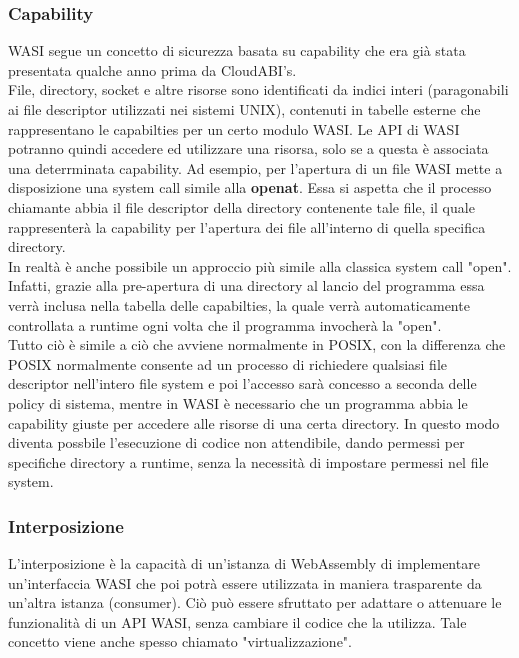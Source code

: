 \subsubsection{Capability}
WASI segue un concetto di sicurezza basata su capability che era già stata presentata qualche anno prima da CloudABI's.
\\File, directory, socket e altre risorse sono identificati da indici interi (paragonabili ai file descriptor utilizzati nei sistemi UNIX), contenuti in tabelle esterne che rappresentano le capabilties per un certo modulo WASI.
Le API di WASI potranno quindi accedere ed utilizzare una risorsa, solo se a questa è associata una deterrminata capability.
Ad esempio, per l'apertura di un file WASI mette a disposizione una system call simile alla \textbf{openat}.
Essa si aspetta che il processo chiamante abbia il file descriptor della directory contenente tale file, il quale rappresenterà la capability per l'apertura dei file all'interno di quella specifica directory.
\\In realtà è anche possibile un approccio più simile alla classica system call "open".
Infatti, grazie alla pre-apertura di una directory al lancio del programma essa verrà inclusa nella tabella delle capabilties, la quale verrà automaticamente controllata a runtime ogni volta che il programma invocherà la "open".
\\Tutto ciò è simile a ciò che avviene normalmente in POSIX, con la differenza che POSIX normalmente consente ad un processo di richiedere qualsiasi file descriptor nell'intero file system e poi l'accesso sarà concesso a seconda delle policy di sistema, mentre in WASI è necessario che un programma abbia le capability giuste per accedere alle risorse di una certa directory. In questo modo diventa possbile l'esecuzione di codice non attendibile, dando permessi per specifiche directory a runtime, senza la necessità di impostare permessi nel file system.\cite*{wasi:capabilities}
\subsubsection{Interposizione}
L'interposizione è la capacità di un'istanza di WebAssembly di implementare un'interfaccia WASI che poi potrà essere utilizzata in maniera trasparente da un'altra istanza (consumer).
Ciò può essere sfruttato per adattare o attenuare le funzionalità di un API WASI, senza cambiare il codice che la utilizza.
Tale concetto viene anche spesso chiamato "virtualizzazione".
